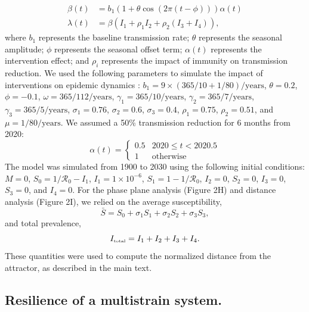 \documentclass[12pt]{article}
\newcommand{\tsub}[2]{#1_{{\textrm{\tiny #2}}}}
\begin{document}
\begin{align}
\beta(t) &= b_1 (1 + \theta \cos(2 \pi (t-\phi))) \alpha(t)\\
\lambda(t) &= \beta (I_1 + \rho_1 I_2 + \rho_2 (I_3 + I_4)), 
\end{align}
where $b_1$ represents the baseline transmission rate; $\theta$ represents the seasonal amplitude; $\phi$ represents the seasonal offset term; $\alpha(t)$ represents the intervention effect; and $\rho_i$ represents the impact of immunity on transmission reduction.
We used the following parameters to simulate the impact of interventions on epidemic dynamics \citep{pitzer2015environmental}: $b_1 = 9 \times (365/10+1/80)/\mathrm{years}$, $\theta = 0.2$, $\phi = -0.1$, $\omega=365/112/\mathrm{years}$, $\gamma_1=365/10/\mathrm{years}$, $\gamma_2=365/7/\mathrm{years}$, $\gamma_3=365/5/\mathrm{years}$, $\sigma_1 = 0.76$, $\sigma_2 = 0.6$, $\sigma_3 = 0.4$, $\rho_1 = 0.75$, $\rho_2 = 0.51$, and $\mu = 1/80/\mathrm{years}$.
We assumed a 50\% transmission reduction for 6 months from 2020:
\begin{equation}
\alpha(t) = \begin{cases}
0.5 & 2020 \leq t< 2020.5\\
1 & \textrm{otherwise}
\end{cases}
\end{equation}
The model was simulated from 1900 to 2030 using the following initial conditions: $M=0$, $S_0=1/\mathcal R_0-I_1$, $I_1=1\times 10^{-6}$, $S_1=1-1/\mathcal R_0$, $I_2=0$, $S_2=0$, $I_3=0$, $S_3=0$, and $I_4=0$.
For the phase plane analysis (Figure 2H) and distance analysis (Figure 2I), we relied on the average susceptibility,
\begin{equation}
\bar{S} = S_0 + \sigma_1 S_1 + \sigma_2 S_2 + \sigma_3 S_3,
\end{equation}
and total prevalence,
\begin{equation}
\tsub{I}{total} = I_1 + I_2 + I_3 + I_4.
\end{equation}
These quantities were used to compute the normalized distance from the attractor, as described in the main text.

\subsection*{Resilience of a multistrain system.}
\end{document}
